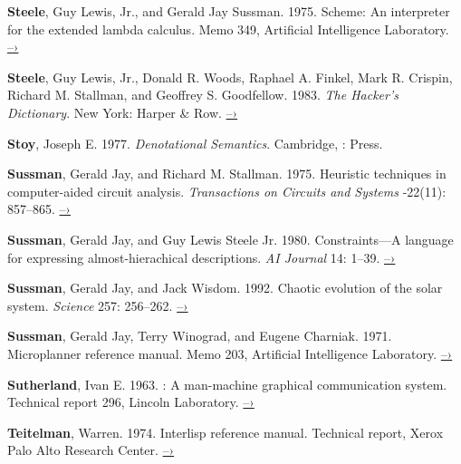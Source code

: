  \label{Steele and Sussman 1975}
\textbf{Steele}, Guy Lewis, Jr., and Gerald Jay Sussman.  1975.  Scheme: An interpreter
for the extended lambda calculus.  Memo 349,  Artificial
Intelligence Laboratory.
\href{http://dspace.mit.edu/handle/1721.1/5794}{–›}

 \label{Steele et al. 1983}
\textbf{Steele}, Guy Lewis, Jr., Donald R. Woods, Raphael A. Finkel, Mark R.  Crispin,
Richard M. Stallman, and Geoffrey S. Goodfellow.  1983.  \textit{The Hacker’s
Dictionary}. New York: Harper \& Row.
\href{http://www.dourish.com/goodies/jargon.html}{–›}

 \label{Stoy 1977}
\textbf{Stoy}, Joseph E.  1977.  \textit{Denotational Semantics}. Cambridge, :
 Press.

 \label{Sussman and Stallman 1975}
\textbf{Sussman}, Gerald Jay, and Richard M. Stallman.  1975.  Heuristic techniques in
computer-aided circuit analysis.  \textit{ Transactions on Circuits
and Systems} -22(11): 857--865.
\href{http://dspace.mit.edu/handle/1721.1/5803}{–›}

 \label{Sussman and Steele 1980}
\textbf{Sussman}, Gerald Jay, and Guy Lewis Steele Jr.  1980.  Constraints---A language
for expressing almost-hierachical descriptions.  \textit{AI Journal} 14: 1--39.
\href{http://dspace.mit.edu/handle/1721.1/6312}{–›}

 \label{Sussman and Wisdom 1992}
\textbf{Sussman}, Gerald Jay, and Jack Wisdom.  1992. Chaotic evolution of the solar
system.  \textit{Science} 257: 256--262.
\href{http://groups.csail.mit.edu/mac/users/wisdom/ss-chaos.pdf}{–›}

 \label{Sussman et al. (1971)}
\textbf{Sussman}, Gerald Jay, Terry Winograd, and Eugene Charniak.  1971.  Microplanner
reference manual.  Memo 203,  Artificial Intelligence Laboratory.
\href{http://dspace.mit.edu/handle/1721.1/6184}{–›}

 \label{Sutherland (1963)}
\textbf{Sutherland}, Ivan E.  1963.  : A man-machine graphical
communication system.  Technical report 296,  Lincoln Laboratory.
\href{https://www.cl.cam.ac.uk/techreports/UCAM-CL-TR-574.pdf}{–›}

 \label{Teitelman 1974}
\textbf{Teitelman}, Warren.  1974.  Interlisp reference manual.  Technical report, Xerox
Palo Alto Research Center.
\href{http://www.softwarepreservation.org/projects/LISP/interlisp/Interlisp-Oct_1974.pdf/view}{–›}

